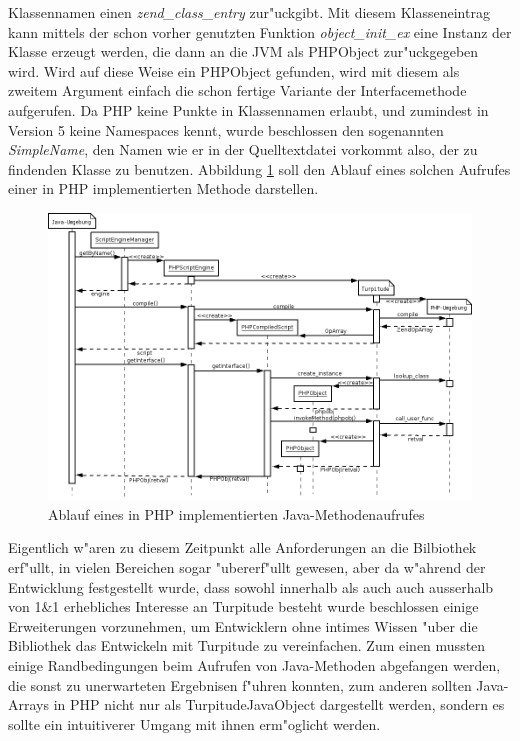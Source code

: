 Klassennamen einen \emph{zend\_class\_entry} zur"uckgibt. Mit diesem Klasseneintrag kann mittels der schon vorher genutzten Funktion \emph{object\_init\_ex}
eine Instanz der Klasse erzeugt werden, die dann an die JVM als PHPObject zur"uckgegeben wird. Wird auf diese Weise ein PHPObject gefunden, wird mit diesem
als zweitem Argument einfach die schon fertige Variante der Interfacemethode aufgerufen. Da PHP keine Punkte in Klassennamen erlaubt, und zumindest in
Version 5 keine Namespaces kennt, wurde beschlossen den sogenannten \emph{SimpleName}, den Namen wie er in der Quelltextdatei vorkommt also, der zu findenden Klasse 
zu benutzen. Abbildung \ref{fig:javaseq} soll den Ablauf eines solchen Aufrufes einer in PHP implementierten Methode darstellen. 

\begin{figure}[h]
\includegraphics[width=\textwidth]{chap1/img/javaseq.png}
\caption{Ablauf eines in PHP implementierten Java-Methodenaufrufes}
\label{fig:javaseq}
\end{figure}

Eigentlich w"aren zu diesem Zeitpunkt alle Anforderungen an die Bilbiothek erf"ullt, in vielen Bereichen sogar "ubererf"ullt gewesen, aber da w"ahrend
der Entwicklung festgestellt wurde, dass sowohl innerhalb als auch auch ausserhalb von 1\&1 erhebliches Interesse an Turpitude besteht wurde beschlossen 
einige Erweiterungen vorzunehmen, um Entwicklern ohne intimes Wissen "uber die Bibliothek das Entwickeln mit Turpitude zu vereinfachen.
Zum einen mussten einige Randbedingungen beim Aufrufen von Java-Methoden abgefangen werden, die sonst zu unerwarteten Ergebnisen f"uhren konnten, zum
anderen sollten Java-Arrays in PHP nicht nur als TurpitudeJavaObject dargestellt werden, sondern es sollte ein intuitiverer Umgang mit ihnen erm"oglicht werden.

